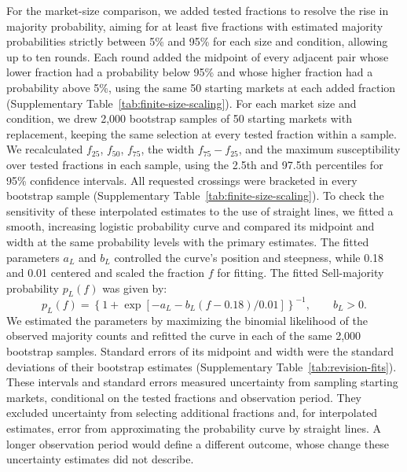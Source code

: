 For the market-size comparison, we added tested fractions to resolve the rise in majority probability,
aiming for at least five fractions with estimated majority probabilities
strictly between 5\%
and 95\% for each size and condition, allowing up to ten rounds. Each
round added the midpoint of every adjacent pair whose lower fraction had
a probability below 95\% and whose higher fraction had a probability
above 5\%, using the same 50 starting markets at each added fraction
(Supplementary Table~\ref{tab:finite-size-scaling}). For each
market size and condition, we drew 2,000 bootstrap samples of 50 starting
markets with replacement, keeping the same selection at every tested
fraction within a sample. We recalculated $f_{25}$, $f_{50}$, $f_{75}$,
the width $f_{75}-f_{25}$, and the maximum susceptibility over tested
fractions in each sample, using the 2.5th and 97.5th percentiles for 95\%
confidence intervals. All requested crossings were bracketed in every
bootstrap sample (Supplementary Table~\ref{tab:finite-size-scaling}). To check the sensitivity of these interpolated estimates to the use of
straight lines, we fitted a smooth, increasing logistic probability curve
and compared its midpoint and width at the same probability levels with
the primary estimates. The fitted parameters $a_L$ and $b_L$ controlled
the curve's position and steepness, while 0.18 and 0.01 centered and
scaled the fraction $f$ for fitting. The fitted Sell-majority probability
$p_L(f)$ was given by:
\begin{equation*}
p_L(f)=\left\{1+\exp\left[-a_L-b_L(f-0.18)/0.01\right]\right\}^{-1},
\qquad b_L>0.
\end{equation*}
We estimated the parameters by maximizing the binomial likelihood of the
observed majority counts and refitted the curve in each of the same
2,000 bootstrap samples. Standard errors of its midpoint and width were
the standard deviations of their bootstrap estimates (Supplementary
Table~\ref{tab:revision-fits}). These intervals and standard errors
measured uncertainty from sampling starting markets, conditional on the
tested fractions and observation period. They excluded uncertainty from
selecting additional fractions and, for interpolated estimates, error
from approximating the probability curve by straight lines. A longer
observation period would define a different outcome, whose change these
uncertainty estimates did not describe.

